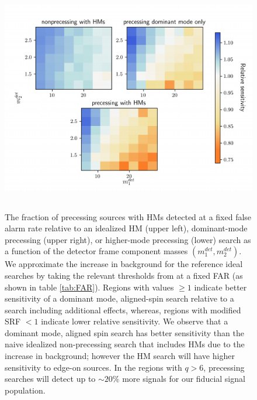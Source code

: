 \begin{figure}
        \centering
        \includegraphics[width=13cm, height=10cm]{figures/HM_and_precession/aLIGO_weightedSRF.pdf}
        \caption{The fraction of precessing sources with HMs detected at a fixed false alarm rate relative to an idealized HM (upper left), dominant-mode precessing (upper right), or higher-mode precessing (lower) search as a function of the detector frame component masses $(m_1^{det}, m_2^{det})$. 
        We approximate the increase in background for the reference ideal searches by taking the relevant thresholds from \cite{Harry:2017weg, Harry:2016ijz} at a fixed FAR (as shown in table \ref{tab:FAR}). Regions with values $\geq 1$ indicate better sensitivity of a dominant mode, aligned-spin search relative to a search including additional effects, whereas, regions with modified SRF $< 1$ indicate lower relative sensitivity. We observe that a dominant mode, aligned spin search has better sensitivity than the naive idealized non-precessing search that includes HMs due to the increase in background; however the HM search will have higher sensitivity to edge-on sources. In the regions with $q > 6$, precessing searches will detect up to $\sim 20\%$ more signals for our fiducial signal
        population.}
        \label{fig:aLIGO_weightedSRF}
\end{figure}

